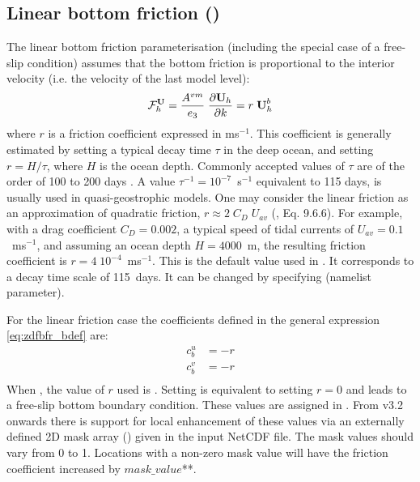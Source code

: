 \documentclass[../main/NEMO_manual]{subfiles}
\begin{document}
\subsection{Linear bottom friction (\protect{})}
\label{subsec:ZDF_bfr_linear}

The linear bottom friction parameterisation (including the special case of a free-slip condition) assumes that
the bottom friction is proportional to the interior velocity (i.e. the velocity of the last model level):
\[
  {\cal F}_h^\textbf{U} = \frac{A^{vm}}{e_3} \; \frac{\partial \textbf{U}_h}{\partial k} = r \; \textbf{U}_h^b
\]
where $r$ is a friction coefficient expressed in ms$^{-1}$.
This coefficient is generally estimated by setting a typical decay time $\tau$ in the deep ocean, 
and setting $r = H / \tau$, where $H$ is the ocean depth.
Commonly accepted values of $\tau$ are of the order of 100 to 200 days \citep{Weatherly_JMR84}.
A value $\tau^{-1} = 10^{-7}$~s$^{-1}$ equivalent to 115 days, is usually used in quasi-geostrophic models.
One may consider the linear friction as an approximation of quadratic friction, $r \approx 2\;C_D\;U_{av}$
(\citet{Gill1982}, Eq. 9.6.6).
For example, with a drag coefficient $C_D = 0.002$, a typical speed of tidal currents of $U_{av} =0.1$~m\;s$^{-1}$,
and assuming an ocean depth $H = 4000$~m, the resulting friction coefficient is $r = 4\;10^{-4}$~m\;s$^{-1}$.
This is the default value used in \NEMO. It corresponds to a decay time scale of 115~days.
It can be changed by specifying  (namelist parameter).

For the linear friction case the coefficients defined in the general expression \autoref{eq:zdfbfr_bdef} are: 
\[
  \begin{split}
    c_b^u &= - r\\
    c_b^v &= - r\\
  \end{split}
\]
When , the value of $r$ used is .
Setting  is equivalent to setting $r=0$ and
leads to a free-slip bottom boundary condition.
These values are assigned in .
From v3.2 onwards there is support for local enhancement of these values via an externally defined 2D mask array
() given in the  input NetCDF file.
The mask values should vary from 0 to 1.
Locations with a non-zero mask value will have the friction coefficient increased by
$mask\_value$**.
\end{document}
